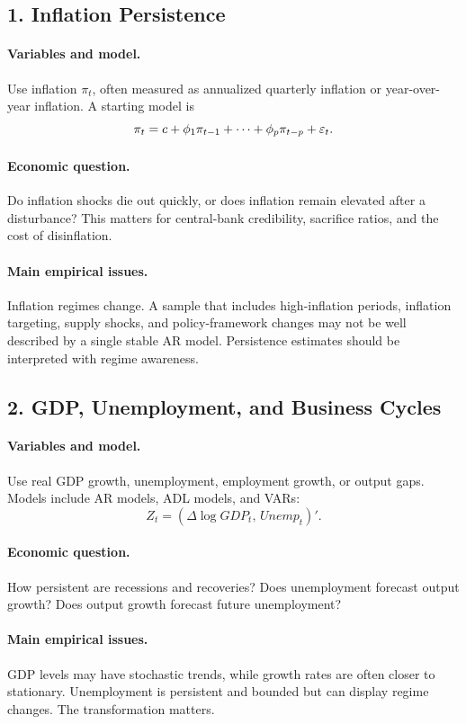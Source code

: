 \subsection{1. Inflation Persistence}
\paragraph{Variables and model.}
Use inflation $\pi_t$, often measured as annualized quarterly inflation or year-over-year inflation. A starting model is
\[
\pi_t=c+\phi_1\pi_{t-1}+\cdots+\phi_p\pi_{t-p}+\varepsilon_t.
\]

\paragraph{Economic question.}
Do inflation shocks die out quickly, or does inflation remain elevated after a disturbance? This matters for central-bank credibility, sacrifice ratios, and the cost of disinflation.

\paragraph{Main empirical issues.}
Inflation regimes change. A sample that includes high-inflation periods, inflation targeting, supply shocks, and policy-framework changes may not be well described by a single stable AR model. Persistence estimates should be interpreted with regime awareness.

\subsection{2. GDP, Unemployment, and Business Cycles}
\paragraph{Variables and model.}
Use real GDP growth, unemployment, employment growth, or output gaps. Models include AR models, ADL models, and VARs:
\[
Z_t=(\Delta \log GDP_t,\,Unemp_t)'.
\]

\paragraph{Economic question.}
How persistent are recessions and recoveries? Does unemployment forecast output growth? Does output growth forecast future unemployment?

\paragraph{Main empirical issues.}
GDP levels may have stochastic trends, while growth rates are often closer to stationary. Unemployment is persistent and bounded but can display regime changes. The transformation matters.

